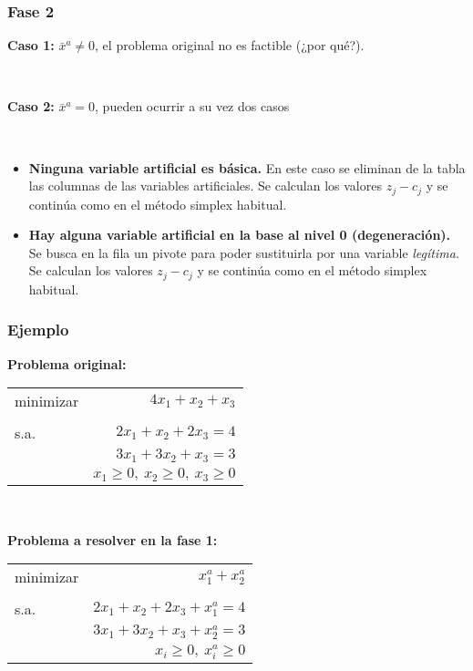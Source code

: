 \documentclass{beamer}
\begin{document}
\begin{frame}
\frametitle{Fase 2}

\textbf{Caso 1:} $\bar{x}^a\neq 0$, el problema original no es factible (¿por qué?).

\

\textbf{Caso 2:} $\bar{x}^a= 0$, pueden ocurrir a su vez dos casos

\

\begin{itemize}
\item \textbf{Ninguna variable artificial es básica.} En este caso se eliminan de la tabla las columnas de las variables artificiales. Se calculan los valores $z_j-c_j$ y se continúa como en el método simplex habitual.

\item \textbf{Hay alguna variable artificial en la base al nivel 0 (degeneración).} Se busca en la fila un pivote para poder sustituirla por una variable \textit{legítima}. Se calculan los valores $z_j-c_j$ y se continúa como en el método simplex habitual.
\end{itemize}



\end{frame}
\begin{frame}
\frametitle{Ejemplo}

\textbf{Problema original:}

\begin{center}
\begin{tabular}{lr}
minimizar & $4x_1 + x_2 + x_3$ \\
	 &  \\
s.a. & $2x_1+x_2+2x_3 =4 $    \\
	 & $3x_1 + 3x_2 + x_3= 3$  \\
	 & $x_1\geq 0,\ x_2\geq 0,\ x_3\geq 0$
\end{tabular}
\end{center}

\

\textbf{Problema a resolver en la fase 1:}

\begin{center}
\begin{tabular}{lr}
minimizar & $x^a_1 + x^a_2$ \\
	 &  \\
s.a. & $2x_1+x_2+2x_3 + x_1^a=4 $    \\
	 & $3x_1 + 3x_2 + x_3 + x_2^a = 3$  \\
	 & $x_i\geq 0,\ x_i^a\geq 0$
\end{tabular}
\end{center}

\end{frame}
\end{document}
